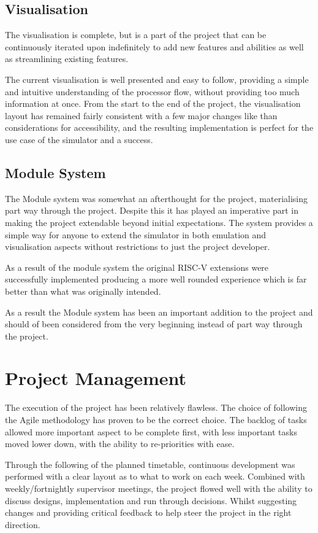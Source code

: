 \subsection{Visualisation}
The visualisation is complete, but is a part of the project that can be continuously iterated upon indefinitely to add new features and abilities as well as streamlining existing features.

The current visualisation is well presented and easy to follow, providing a simple and intuitive understanding of the processor flow, without providing too much information at once. From the start to the end of the project, the visualisation layout has remained fairly consistent with a few major changes like than considerations for accessibility, and the resulting implementation is perfect for the use case of the simulator and a success.

\subsection{Module System}
The Module system was somewhat an afterthought for the project, materialising part way through the project. Despite this it has played an imperative part in making the project extendable beyond initial expectations. The system provides a simple way for anyone to extend the simulator in both emulation and visualisation aspects without restrictions to just the project developer.

As a result of the module system the original RISC-V extensions were successfully implemented producing a more well rounded experience which is far better than what was originally intended. 

As a result the Module system has been an important addition to the project and should of been considered from the very beginning instead of part way through the project. 

\section{Project Management}
The execution of the project has been relatively flawless. The choice of following the Agile \cite{atlassian_2022_what} methodology has proven to be the correct choice. The backlog of tasks allowed more important aspect to be complete first, with less important tasks moved lower down, with the ability to re-priorities with ease.

Through the following of the planned timetable, continuous development was performed with a clear layout as to what to work on each week. Combined with weekly/fortnightly supervisor meetings, the project flowed well with the ability to discuss designs, implementation and run through decisions. Whilst suggesting changes and providing critical feedback to help steer the project in the right direction.

